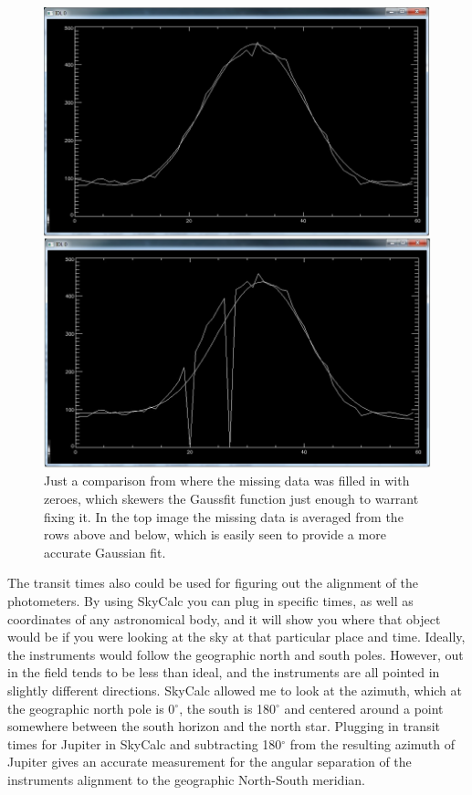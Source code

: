 \documentclass[11pt]{article}
\begin{document}
\begin{figure}[h!]
\includegraphics[scale=0.6]{gillam_with_avg_fill_vs_original_fill.jpg}
\caption{Just a comparison from where the missing data was filled in with zeroes, which skewers the Gaussfit function just enough to warrant fixing it. In the top image the missing data is averaged from the rows above and below, which is easily seen to provide a more accurate Gaussian fit. }
\end{figure}



The transit times also could be used for figuring out the alignment of the photometers. By using SkyCalc you can plug in specific times, as well as coordinates of any astronomical body, and it will show you where that object would be if you were looking at the sky at that particular place and time. Ideally, the instruments would follow the geographic north and south poles. However, out in the field tends to be less than ideal, and the instruments are all pointed in slightly different directions. SkyCalc allowed me to look at the azimuth, which at the geographic north pole is 0$^\circ$, the south is 180$^\circ$ and centered around a point somewhere between the south horizon and the north star. Plugging in transit times for Jupiter in SkyCalc and subtracting 180$^\circ$ from the resulting azimuth of Jupiter gives an accurate measurement for the angular separation of the instruments alignment to the geographic North-South meridian.
\end{document}
